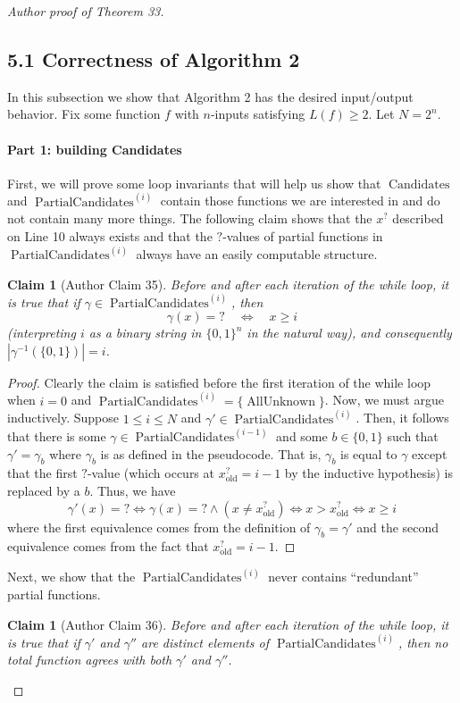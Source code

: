\documentclass[10pt,a4paper]{article}
\newtheorem{ntclaim}[nttheorem]{Claim}
\newcommand{\PC}[1]{\operatorname{PartialCandidates}^{(#1)}}
\newcommand{\Candidates}{\operatorname{Candidates}}
\begin{document}
\begin{proof}[Author proof of Theorem 33]
\subsection*{5.1 Correctness of Algorithm 2}
In this subsection we show that Algorithm 2 has the desired input/output behavior. Fix some function $f$ with $n$-inputs satisfying $L(f)\geq 2$. Let $N=2^n$.
\paragraph{Part 1: building Candidates}
First, we will prove some loop invariants that will help us show that $\Candidates$ and $\PC{i}$ contain those functions we are interested in and do not contain many more things.
The following claim shows that the $x^?$ described on Line 10 always exists and that the $?$-values of partial functions in $\PC{i}$ always have an easily computable structure.
\begin{ntclaim}[Author Claim 35]
Before and after each iteration of the while loop, it is true that if $\gamma\in\PC{i}$, then
\[\gamma(x)=?\quad\Longleftrightarrow\quad x\geq i\]
(interpreting $i$ as a binary string in $\{0,1\}^n$ in the natural way), and consequently $|\gamma^{-1}(\{0,1\})|=i$.
\end{ntclaim}
\begin{proof}
Clearly the claim is satisfied before the first iteration of the while loop when $i=0$ and $\PC{i}=\{\operatorname{AllUnknown}\}$.
Now, we must argue inductively. Suppose $1\leq i\leq N$ and $\gamma'\in\PC{i}$. Then, it follows that there is some $\gamma\in\PC{i-1}$ and some $b\in\{0,1\}$ such that $\gamma'=\gamma_b$ where $\gamma_b$ is as defined in the pseudocode. That is, $\gamma_b$ is equal to $\gamma$ except that the first $?$-value (which occurs at $x^?_{\mathrm{old}}=i-1$ by the inductive hypothesis) is replaced by a $b$. Thus, we have
\[\gamma'(x)=?\Longleftrightarrow\gamma(x)=?\land(x\ne x^?_{\mathrm{old}})\Longleftrightarrow x>x^?_{\mathrm{old}}\Longleftrightarrow x\geq i\]
where the first equivalence comes from the definition of $\gamma_b=\gamma'$ and the second equivalence comes from the fact that $x^?_{\mathrm{old}}=i-1$.
\end{proof}
Next, we show that the $\PC{i}$ never contains ``redundant'' partial functions.
\begin{ntclaim}[Author Claim 36]
Before and after each iteration of the while loop, it is true that if $\gamma'$ and $\gamma''$ are distinct elements of $\PC{i}$, then no total function agrees with both $\gamma'$ and $\gamma''$.

\end{ntclaim}
\end{proof}
\end{document}
